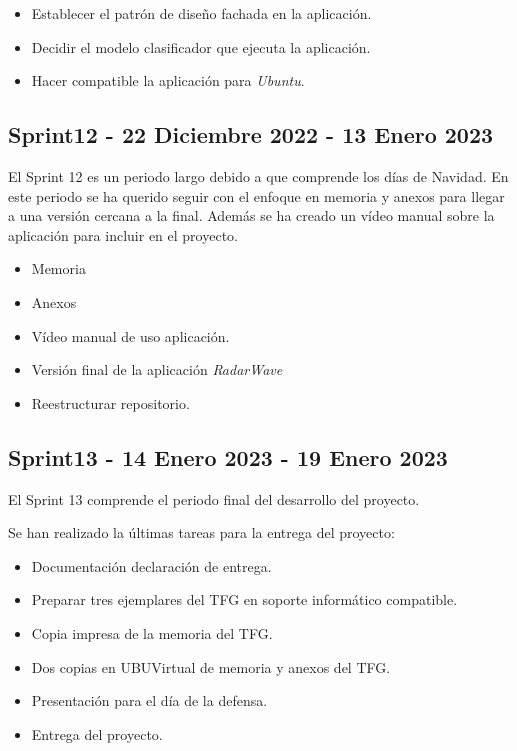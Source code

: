 \begin{itemize}
\item Establecer el patrón de diseño fachada en la aplicación.
\item Decidir el modelo clasificador que ejecuta la aplicación.
\item Hacer compatible la aplicación para \textit{Ubuntu}.
\end{itemize}

\subsection{Sprint12 - 22 Diciembre 2022 - 13 Enero 2023}

El Sprint 12 es un periodo largo debido a que comprende los días de Navidad. En este periodo se ha querido seguir con el enfoque en memoria y anexos para llegar a una versión cercana a la final. Además se ha creado un vídeo manual sobre la aplicación para incluir en el proyecto.

\begin{itemize}
\item Memoria
\item Anexos
\item Vídeo manual de uso aplicación.
\item Versión final de la aplicación \textit{RadarWave}
\item Reestructurar repositorio.
\end{itemize}

\subsection{Sprint13 - 14 Enero 2023 - 19 Enero 2023}

El Sprint 13 comprende el periodo final del desarrollo del proyecto.

Se han realizado la últimas tareas para la entrega del proyecto:

\begin{itemize}
\item Documentación declaración de entrega.
\item Preparar tres ejemplares del TFG en soporte informático compatible.
\item Copia impresa de la memoria del TFG.
\item Dos copias en UBUVirtual de memoria y anexos del TFG.
\item Presentación para el día de la defensa.
\item Entrega del proyecto.
\end{itemize}


